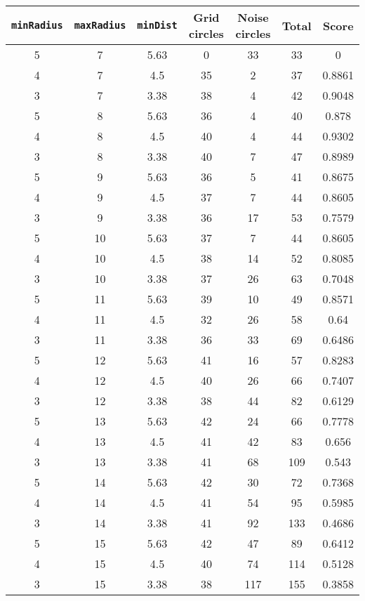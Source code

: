 \documentclass[letterpaper, 12pt]{article}
\begin{document}
\begin{longtable}{|c|c|c|c|c|c|c|}
\hline
\textbf{\texttt{minRadius}} & \textbf{\texttt{maxRadius}} & \textbf{\texttt{minDist}} & \textbf{Grid circles} & \textbf{Noise circles} & \textbf{Total} & \textbf{Score} \\
\hline
5 & 7 & 5.63 & 0 & 33 & 33 & 0 \\
\hline
4 & 7 & 4.5 & 35 & 2 & 37 & 0.8861 \\
\hline
3 & 7 & 3.38 & 38 & 4 & 42 & 0.9048 \\
\hline
5 & 8 & 5.63 & 36 & 4 & 40 & 0.878 \\
\hline
4 & 8 & 4.5 & 40 & 4 & 44 & 0.9302 \\
\hline
3 & 8 & 3.38 & 40 & 7 & 47 & 0.8989 \\
\hline
5 & 9 & 5.63 & 36 & 5 & 41 & 0.8675 \\
\hline
4 & 9 & 4.5 & 37 & 7 & 44 & 0.8605 \\
\hline
3 & 9 & 3.38 & 36 & 17 & 53 & 0.7579 \\
\hline
5 & 10 & 5.63 & 37 & 7 & 44 & 0.8605 \\
\hline
4 & 10 & 4.5 & 38 & 14 & 52 & 0.8085 \\
\hline
3 & 10 & 3.38 & 37 & 26 & 63 & 0.7048 \\
\hline
5 & 11 & 5.63 & 39 & 10 & 49 & 0.8571 \\
\hline
4 & 11 & 4.5 & 32 & 26 & 58 & 0.64 \\
\hline
3 & 11 & 3.38 & 36 & 33 & 69 & 0.6486 \\
\hline
5 & 12 & 5.63 & 41 & 16 & 57 & 0.8283 \\
\hline
4 & 12 & 4.5 & 40 & 26 & 66 & 0.7407 \\
\hline
3 & 12 & 3.38 & 38 & 44 & 82 & 0.6129 \\
\hline
5 & 13 & 5.63 & 42 & 24 & 66 & 0.7778 \\
\hline
4 & 13 & 4.5 & 41 & 42 & 83 & 0.656 \\
\hline
3 & 13 & 3.38 & 41 & 68 & 109 & 0.543 \\
\hline
5 & 14 & 5.63 & 42 & 30 & 72 & 0.7368 \\
\hline
4 & 14 & 4.5 & 41 & 54 & 95 & 0.5985 \\
\hline
3 & 14 & 3.38 & 41 & 92 & 133 & 0.4686 \\
\hline
5 & 15 & 5.63 & 42 & 47 & 89 & 0.6412 \\
\hline
4 & 15 & 4.5 & 40 & 74 & 114 & 0.5128 \\
\hline
3 & 15 & 3.38 & 38 & 117 & 155 & 0.3858 \\

\end{longtable}
\end{document}
